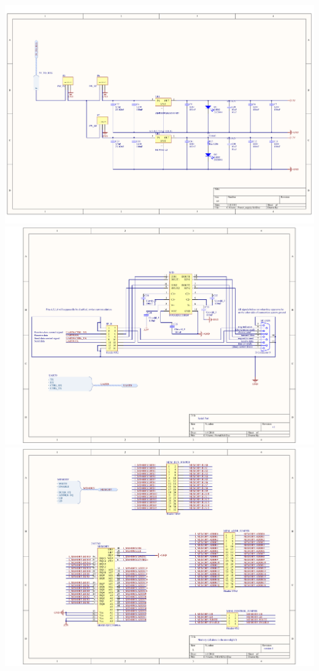 \documentclass[../main/report.tex]{subfiles}
\begin{document}
\newpage
\includegraphics[width=\paperwidth]{../appendix/PCB_schematics/Power_supply.PDF}
\newpage
\includegraphics[width=\paperwidth]{../appendix/PCB_schematics/Serial.PDF}
\newpage
\includegraphics[width=\paperwidth]{../appendix/PCB_schematics/SRAM.PDF}
\end{document}
